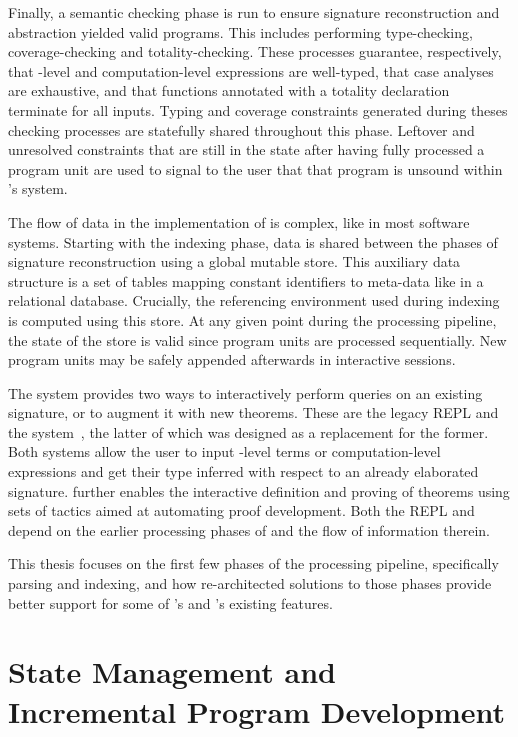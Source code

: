 Finally, a semantic checking phase is run to ensure signature reconstruction and abstraction yielded valid programs.
This includes performing type-checking, coverage-checking and totality-checking.
These processes guarantee, respectively, that \LF-level and computation-level expressions are well-typed, that case analyses are exhaustive, and that functions annotated with a totality declaration terminate for all inputs.
Typing and coverage constraints generated during theses checking processes are statefully shared throughout this phase.
Leftover and unresolved constraints that are still in the state after having fully processed a program unit are used to signal to the user that that program is unsound within \Beluga's system.

The flow of data in the implementation of \Beluga is complex, like in most software systems.
Starting with the indexing phase, data is shared between the phases of signature reconstruction using a global mutable store.
This auxiliary data structure is a set of tables mapping constant identifiers to meta-data like in a relational database.
Crucially, the referencing environment used during indexing is computed using this store.
At any given point during the processing pipeline, the state of the store is valid since program units are processed sequentially.
New program units may be safely appended afterwards in interactive sessions.

The \Beluga system provides two ways to interactively perform queries on an existing \Beluga signature, or to augment it with new theorems.
These are the legacy \ac{REPL} and the \Harpoon system~\cite{errington2021harpoon}, the latter of which was designed as a replacement for the former.
Both systems allow the user to input \LF-level terms or computation-level expressions and get their type inferred with respect to an already elaborated \Beluga signature.
\Harpoon further enables the interactive definition and proving of theorems using sets of tactics aimed at automating proof development.
Both the \ac{REPL} and \Harpoon depend on the earlier processing phases of \Beluga and the flow of information therein.

This thesis focuses on the first few phases of the \Beluga processing pipeline, specifically parsing and indexing, and how re-architected solutions to those phases provide better support for some of \Beluga's and \Harpoon's existing features.

\section{State Management and Incremental Program Development}

